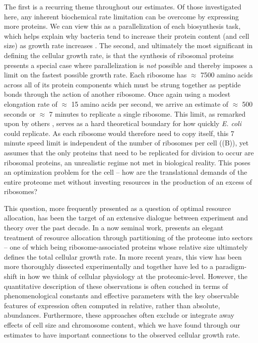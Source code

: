 The first is a recurring theme throughout our estimates. Of those investigated
here, any inherent biochemical rate limitation can be overcome by expressing more
proteins. We can view this as a parallelization of each biosynthesis task,
which helps explain why bacteria tend to increase their protein content (and
cell size) as growth rate increases \citep{ojkic2019}. The second, and
ultimately the most significant in defining the cellular growth rate, is that
the synthesis of ribosomal proteins presents a special case where
parallelization is \textit{not} possible and thereby imposes a limit on the
fastest possible growth rate. Each ribosome has $\approx$ 7500 amino acids
across all of its protein components which must be strung together as peptide
bonds through the action of another ribosome. Once again using a modest elongation rate of
$\approx$ 15 amino acids per second, we arrive an estimate of $\approx$ 500
seconds or $\approx$ 7 minutes to replicate a single ribosome. This limit, as remarked upon by others
\citep{dill2011}, serves as a hard theoretical boundary for how quickly \textit{E. coli}
could replicate. As each ribosome would therefore need to copy itself, this 7
minute speed limit is independent of the number of ribosomes per cell
((B)), yet assumes that the only proteins that need to be
replicated for division to occur are ribosomal proteins, an unrealistic regime
not met in biological reality. This poses an optimization problem for the
cell -- how are the translational demands of the entire proteome met without
investing resources in the production of an excess of ribosomes?

This question, more frequently presented as a question of optimal resource
allocation, has been the target of an extensive dialogue between experiment and
theory over the past decade. In a now seminal work,
\cite{scott2010} presents an elegant treatment of resource allocation through
partitioning of the proteome into sectors -- one of which being
ribosome-associated proteins whose relative size ultimately defines
the total cellular growth rate. In more recent years, this view has been more
thoroughly dissected experimentally
\citep{klumpp2014,basan2015,dai2018, dai2016, erickson2017} and together
have led to a paradigm-shift in how we think of cellular physiology at the
proteomic-level. However, the quantitative description of these  observations is
often couched in terms of phenomenological constants and effective parameters
with the key observable features of expression often computed in relative, rather
than absolute, abundances. Furthermore, these approaches often exclude or
integrate away effects of cell size and chromosome content, which we have
found through our estimates to have important connections to the observed cellular
growth rate.

